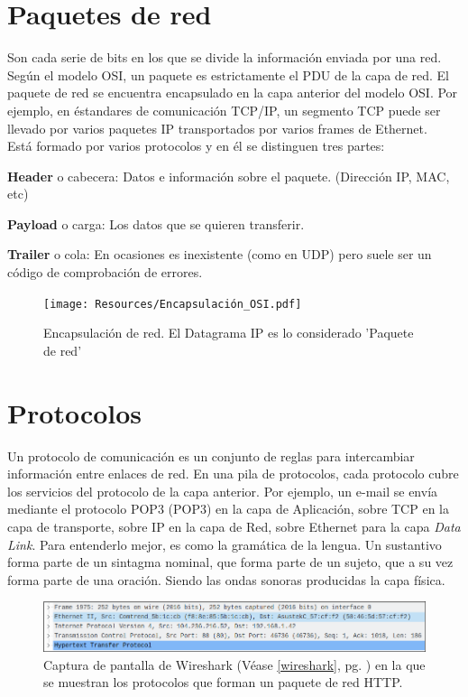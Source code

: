 \documentclass[a4paper, 11pt]{report} %
\newcommand{\acr}[1]{\acrshort{#1} (\acrlong{#1})}
\begin{document}
%
\newpage
\section{Paquetes de red}
Son cada serie de bits en los que se divide la información enviada por una red. \\ Según el modelo OSI, un paquete es estrictamente el PDU de la capa de red. El paquete de red se encuentra encapsulado en la capa anterior del modelo OSI. Por ejemplo, en éstandares de comunicación TCP/IP, un segmento TCP puede ser llevado por varios paquetes IP transportados por varios frames de Ethernet. \\Está formado por varios protocolos y en él se distinguen tres partes:
\begin{description}
\item \textbf{Header} o cabecera: Datos e información sobre el paquete. (Dirección IP, MAC, etc)
\item \textbf{Payload} o carga: Los datos que se quieren transferir.
\item \textbf{Trailer} o cola: En ocasiones es inexistente (como en UDP) pero suele ser un código de comprobación de errores.
\end{description}
\vspace*{0.5cm}
\begin{figure}[H]
\noindent
\centering
\texttt{[image: Resources/Encapsulación\_OSI.pdf]}
\caption{Encapsulación de red. El Datagrama IP es lo considerado 'Paquete de red'}
\end{figure}
\newpage

\section{Protocolos}
Un protocolo de comunicación es un conjunto de reglas para intercambiar información entre enlaces de red. En una pila de protocolos, cada protocolo cubre los servicios del protocolo de la capa anterior. Por ejemplo, un e-mail se envía mediante el protocolo \acr{POP3} en la capa de Aplicación, sobre TCP en la capa de transporte, sobre IP en la capa de Red, sobre Ethernet para la capa \textit{Data Link}. Para entenderlo mejor, es como la gramática de la lengua. Un sustantivo forma parte de un sintagma nominal, que forma parte de un sujeto, que a su vez forma parte de una oración. Siendo las ondas sonoras producidas la capa física.
\begin{figure}[H]
\noindent
\includegraphics[width=\textwidth]{Resources/Wireshark01.png}
\caption[Captura de pantalla de Wireshark]{Captura de pantalla de Wireshark (Véase \ref{wireshark}, pg. \pageref{wireshark}) en la que se muestran los protocolos que forman un paquete de red HTTP.}
\end{figure}
\end{document}
